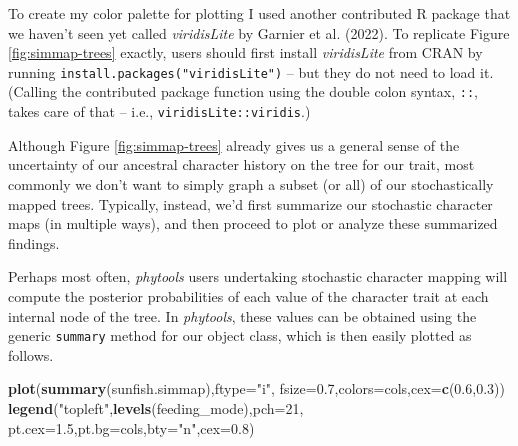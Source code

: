 \documentclass[fleqn,10pt,lineno]{wlpeerj} %
\newenvironment{Shaded}{\begin{snugshade}}{\end{snugshade}}
\newcommand{\AttributeTok}[1]{\textcolor[rgb]{0.13,0.29,0.53}{#1}}
\newcommand{\DecValTok}[1]{\textcolor[rgb]{0.00,0.00,0.81}{#1}}
\newcommand{\FloatTok}[1]{\textcolor[rgb]{0.00,0.00,0.81}{#1}}
\newcommand{\FunctionTok}[1]{\textcolor[rgb]{0.13,0.29,0.53}{\textbf{#1}}}
\newcommand{\NormalTok}[1]{#1}
\newcommand{\StringTok}[1]{\textcolor[rgb]{0.31,0.60,0.02}{#1}}
\begin{document}
To create my color palette for plotting I used another contributed R package that we haven't seen yet called \emph{viridisLite} by Garnier et al. (2022). To replicate Figure \ref{fig:simmap-trees} exactly, users should first install \emph{viridisLite} from CRAN by running \texttt{install.packages("viridisLite")} -- but they do not need to load it. (Calling the contributed package function using the double colon syntax, \texttt{::}, takes care of that -- i.e., \texttt{viridisLite::viridis}.)

Although Figure \ref{fig:simmap-trees} already gives us a general sense of the uncertainty of our ancestral character history on the tree for our trait, most commonly we don't want to simply graph a subset (or all) of our stochastically mapped trees. Typically, instead, we'd first summarize our stochastic character maps (in multiple ways), and then proceed to plot or analyze these summarized findings.

Perhaps most often, \emph{phytools} users undertaking stochastic character mapping will compute the posterior probabilities of each value of the character trait at each internal node of the tree. In \emph{phytools}, these values can be obtained using the generic \texttt{summary} method for our object class, which is then easily plotted as follows.

\begin{Shaded}
\begin{Highlighting}[]
\FunctionTok{plot}\NormalTok{(}\FunctionTok{summary}\NormalTok{(sunfish.simmap),}\AttributeTok{ftype=}\StringTok{"i"}\NormalTok{,}
  \AttributeTok{fsize=}\FloatTok{0.7}\NormalTok{,}\AttributeTok{colors=}\NormalTok{cols,}\AttributeTok{cex=}\FunctionTok{c}\NormalTok{(}\FloatTok{0.6}\NormalTok{,}\FloatTok{0.3}\NormalTok{))}
\FunctionTok{legend}\NormalTok{(}\StringTok{"topleft"}\NormalTok{,}\FunctionTok{levels}\NormalTok{(feeding\_mode),}\AttributeTok{pch=}\DecValTok{21}\NormalTok{,}
  \AttributeTok{pt.cex=}\FloatTok{1.5}\NormalTok{,}\AttributeTok{pt.bg=}\NormalTok{cols,}\AttributeTok{bty=}\StringTok{"n"}\NormalTok{,}\AttributeTok{cex=}\FloatTok{0.8}\NormalTok{)}
\end{Highlighting}
\end{Shaded}
\end{document}
